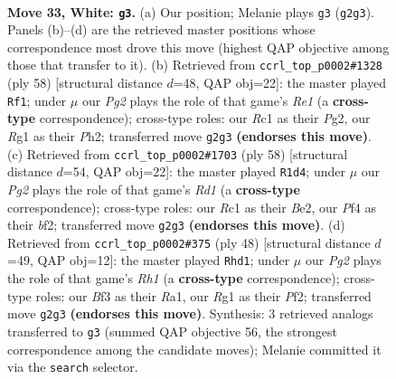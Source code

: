 \documentclass[11pt]{article}
\begin{document}
\clearpage

\begin{figure}[p]\centering
\begin{subfigure}{0.46\textwidth}\centering
\resizebox{\linewidth}{!}{%
\newchessgame
\chessboard[
  setfen={3r1k1r/1p3p1p/4b1p1/p2p4/5P2/3K1B2/PP4PP/2R3RN w - - 7 33},
  showmover=false,
  pgfstyle=straightmove, color=movearrow, markmove={g2-g3}
]}
\caption{}
\end{subfigure}\hfill
\begin{subfigure}{0.46\textwidth}\centering
\resizebox{\linewidth}{!}{%
\newchessgame
\chessboard[
  setfen={1rbr1k2/5p1p/pP2p3/n2p4/6R1/P4N2/2P1B1PP/2K1R3 w - - 4 30},
  showmover=false,
  pgfstyle=straightmove, color=movearrow, markmove={e1-f1}
]}
\caption{}
\end{subfigure}
\\[4pt]
\begin{subfigure}{0.46\textwidth}\centering
\resizebox{\linewidth}{!}{%
\newchessgame
\chessboard[
  setfen={2r3k1/r4p2/p2R3p/1p6/8/PP2p3/1P2BbPP/1K1R4 w - - 4 30},
  showmover=false,
  pgfstyle=straightmove, color=movearrow, markmove={d1-d4}
]}
\caption{}
\end{subfigure}\hfill
\begin{subfigure}{0.46\textwidth}\centering
\resizebox{\linewidth}{!}{%
\newchessgame
\chessboard[
  setfen={2rbk2r/5p1p/2p1p3/p4p2/5B2/1PP5/2K2PPP/R6R w k - 6 25},
  showmover=false,
  pgfstyle=straightmove, color=movearrow, markmove={h1-d1}
]}
\caption{}
\end{subfigure}
\caption{\textbf{Move 33, White: \texttt{g3}.} (a) Our position; Melanie plays \texttt{g3} (\texttt{g2g3}). Panels (b)--(d) are the retrieved master positions whose correspondence most drove this move (highest QAP objective among those that transfer to it). (b) Retrieved from \texttt{ccrl\_top\_p0002\#1328} (ply 58) [structural distance $d$=48, QAP obj=22]: the master played \texttt{Rf1}; under $\mu$ our \emph{Pg2} plays the role of that game's \emph{Re1} (a \textbf{cross-type} correspondence); cross-type roles: our \emph{R}c1 as their \emph{P}g2, our \emph{R}g1 as their \emph{P}h2; transferred move \texttt{g2g3} \textbf{(endorses this move)}. (c) Retrieved from \texttt{ccrl\_top\_p0002\#1703} (ply 58) [structural distance $d$=54, QAP obj=22]: the master played \texttt{R1d4}; under $\mu$ our \emph{Pg2} plays the role of that game's \emph{Rd1} (a \textbf{cross-type} correspondence); cross-type roles: our \emph{R}c1 as their \emph{B}e2, our \emph{P}f4 as their \emph{b}f2; transferred move \texttt{g2g3} \textbf{(endorses this move)}. (d) Retrieved from \texttt{ccrl\_top\_p0002\#375} (ply 48) [structural distance $d$=49, QAP obj=12]: the master played \texttt{Rhd1}; under $\mu$ our \emph{Pg2} plays the role of that game's \emph{Rh1} (a \textbf{cross-type} correspondence); cross-type roles: our \emph{B}f3 as their \emph{R}a1, our \emph{R}g1 as their \emph{P}f2; transferred move \texttt{g2g3} \textbf{(endorses this move)}. Synthesis: 3 retrieved analogs transferred to \texttt{g3} (summed QAP objective 56, the strongest correspondence among the candidate moves); Melanie committed it via the \texttt{search} selector.}
\label{fig:thought-m64}
\end{figure}
\end{document}
